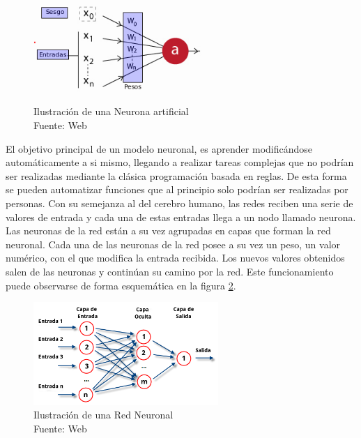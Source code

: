 \begin{figure}[H]
    \begin{center}
        \includegraphics[width=7cm]{img/capitulo_2/neurona.png}
    \end{center}
    \caption{Ilustración de una Neurona artificial
        \\Fuente: Web}
    \label{fig:classical_ml}
\end{figure}

El objetivo principal de un modelo neuronal, es aprender modificándose automáticamente a si mismo, llegando a realizar tareas complejas que no podrían ser realizadas mediante la clásica programación basada en reglas. De esta forma se pueden automatizar funciones que al principio solo podrían ser realizadas por personas. Con su semejanza al del cerebro humano, las redes reciben una serie de valores de entrada y cada una de estas entradas llega a un nodo llamado neurona.\\

Las neuronas de la red están a su vez agrupadas en capas que forman la red neuronal. Cada una de las neuronas de la red posee a su vez un peso, un valor numérico, con el que modifica la entrada recibida. Los nuevos valores obtenidos salen de las neuronas y continúan su camino por la red. Este funcionamiento puede observarse de forma esquemática en la figura \ref{fig:estructura_red_neuronal}.\\

\begin{figure}[H]
    \begin{center}
        \includegraphics[width=7cm]{img/capitulo_2/Redes_neuronales_esquema.png}
    \end{center}
    \caption{Ilustración de una Red Neuronal
        \\Fuente: Web}
    \label{fig:estructura_red_neuronal}
\end{figure}

